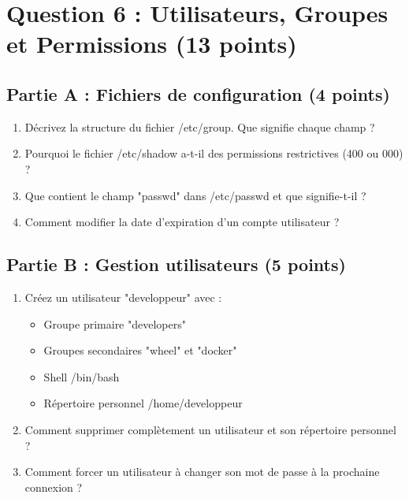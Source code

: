 \documentclass[12pt,a4paper]{article}
\begin{document}
\newpage


\section{Question 6 : Utilisateurs, Groupes et Permissions (13 points)}

\begin{questionbox}
\subsection*{Partie A : Fichiers de configuration (4 points)}
\begin{enumerate}[label=\alph*)]
    \item Décrivez la structure du fichier /etc/group. Que signifie chaque champ ?
    \item Pourquoi le fichier /etc/shadow a-t-il des permissions restrictives (400 ou 000) ?
    \item Que contient le champ "passwd" dans /etc/passwd et que signifie-t-il ?
    \item Comment modifier la date d'expiration d'un compte utilisateur ?
\end{enumerate}

\subsection*{Partie B : Gestion utilisateurs (5 points)}
\begin{enumerate}[label=\alph*)]
    \item Créez un utilisateur "developpeur" avec :
    \begin{itemize}
        \item Groupe primaire "developers"
        \item Groupes secondaires "wheel" et "docker"
        \item Shell /bin/bash
        \item Répertoire personnel /home/developpeur
    \end{itemize}
    \item Comment supprimer complètement un utilisateur et son répertoire personnel ?
    \item Comment forcer un utilisateur à changer son mot de passe à la prochaine connexion ?
\end{enumerate}


\end{questionbox}
\end{document}
